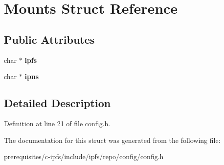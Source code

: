 \hypertarget{struct_mounts}{}\section{Mounts Struct Reference}
\label{struct_mounts}
\subsection*{Public Attributes}
\begin{DoxyCompactItemize}
\item 
\mbox{\label{struct_mounts_a4b71c36d765974d7dfe544b457e5e226}} 
char $\ast$ {\bfseries ipfs}
\item 
\mbox{\label{struct_mounts_a3eb08b4542ea12e27900b85ee2e4c5ca}} 
char $\ast$ {\bfseries ipns}
\end{DoxyCompactItemize}


\subsection{Detailed Description}


Definition at line 21 of file config.\+h.



The documentation for this struct was generated from the following file\+:\begin{DoxyCompactItemize}
\item 
prerequisites/c-\/ipfs/include/ipfs/repo/config/config.\+h\end{DoxyCompactItemize}
